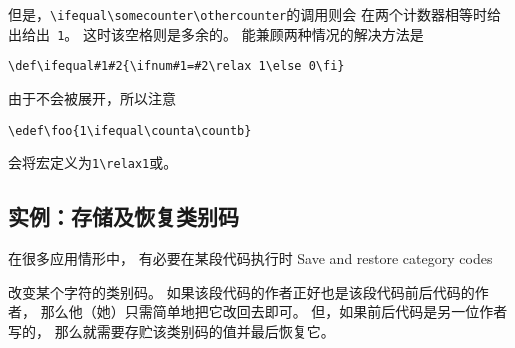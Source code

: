 \documentclass{book}
\begin{document}
但是，\verb-\ifequal\somecounter\othercounter-的调用则会
在两个计数器相等时给出给出\verb*- 1-。
这时该空格则是多余的。
能兼顾两种情况的解决方法是
\begin{verbatim}
\def\ifequal#1#2{\ifnum#1=#2\relax 1\else 0\fi}
\end{verbatim}
由于不会被展开，所以注意
\begin{verbatim}
\edef\foo{1\ifequal\counta\countb}
\end{verbatim}
会将宏定义为\verb-1\relax1-或。

\subsection{实例：存储及恢复类别码}
\label{store:cat}

在很多应用情形中，
有必要在某段代码执行时
\howto Save and restore category codes\par
改变某个字符的类别码。
如果该段代码的作者正好也是该段代码前后代码的作者，
那么他（她）只需简单地把它改回去即可。
但，如果前后代码是另一位作者写的，
那么就需要存贮该类别码的值并最后恢复它。
\end{document}
